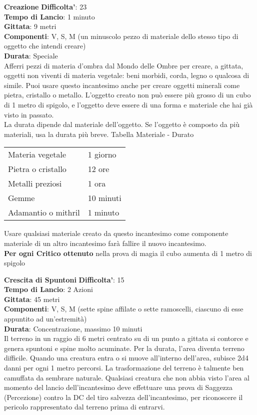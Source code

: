 \begin{multicols}{2}
\medskip\textbf{Creazione}
\textbf{Difficolta'}: 23\\
\textbf{Tempo di Lancio}: 1 minuto\\
\textbf{Gittata}: 9 metri\\
\textbf{Componenti}: V, S, M (un minuscolo pezzo di materiale dello stesso tipo di oggetto che intendi creare) \\
\textbf{Durata}: Speciale\\
Afferri pezzi di materia d’ombra dal Mondo delle Ombre per creare, a gittata, oggetti non viventi di materia vegetale: beni morbidi, corda, legno o qualcosa di simile. Puoi usare questo incantesimo anche per creare oggetti minerali come pietra, cristallo o metallo. L’oggetto creato non può essere più grosso di un cubo di 1 metro di spigolo, e l’oggetto deve essere di una forma e materiale che hai già visto in passato.\\
La durata dipende dal materiale dell’oggetto. Se l’oggetto è composto da più materiali, usa la durata più breve.
\medskip
Tabella Materiale - Durato
\medskip

\begin{tabularx}{0.45\textwidth}{lX}
	\hline 
Materia vegetale &1 giorno\\
Pietra o cristallo &12 ore\\
Metalli preziosi &1 ora\\
Gemme &10 minuti\\
Adamantio o mithril &1 minuto\\
\end{tabularx} 
\medskip

Usare qualsiasi materiale creato da questo incantesimo come componente materiale di un altro incantesimo farà fallire il nuovo incantesimo.\\
\textbf{Per ogni Critico ottenuto} nella prova di magia il cubo aumenta di 1 metro di spigolo

\medskip\textbf{Crescita di Spuntoni}
\textbf{Difficolta'}: 15\\
\textbf{Tempo di Lancio}: 2 Azioni\\
\textbf{Gittata}: 45 metri\\
\textbf{Componenti}: V, S, M (sette spine affilate o sette ramoscelli, ciascuno di esse appuntito ad un’estremità)\\
\textbf{Durata}: Concentrazione, massimo 10 minuti\\
Il terreno in un raggio di 6 metri centrato su di un punto a gittata si contorce e genera spuntoni e spine molto acuminate. Per la durata, l’area diventa terreno difficile. Quando una creatura entra o si muove all’interno dell’area, subisce 2d4 danni per ogni 1 metro percorsi.
La trasformazione del terreno è talmente ben camuffata da sembrare naturale. Qualsiasi creatura che non abbia visto l’area al momento del lancio dell’incantesimo deve effettuare una prova di Saggezza (Percezione) contro la DC del tiro salvezza dell’incantesimo, per riconoscere il pericolo rappresentato dal terreno prima di entrarvi. 


\end{multicols}

